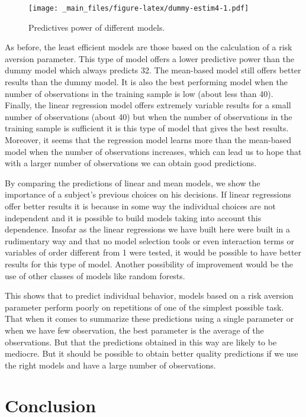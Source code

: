 \documentclass[
]{book}
\begin{document}
\begin{figure}
\centering
\texttt{[image: \_main\_files/figure-latex/dummy-estim4-1.pdf]}
\caption{\label{fig:dummy-estim4}Predictives power of different models.}
\end{figure}

As before, the least efficient models are those based on the calculation
of a risk aversion parameter. This type of model offers a lower
predictive power than the dummy model which always predicts 32. The
mean-based model still offers better results than the dummy model. It is
also the best performing model when the number of observations in the
training sample is low (about less than 40). Finally, the linear
regression model offers extremely variable results for a small number of
observations (about 40) but when the number of observations in the
training sample is sufficient it is this type of model that gives the
best results. Moreover, it seems that the regression model learns more
than the mean-based model when the number of observations increases,
which can lead us to hope that with a larger number of observations we
can obtain good predictions.

By comparing the predictions of linear and mean models, we show the
importance of a subject's previous choices on his decisions. If linear
regressions offer better results it is because in some way the
individual choices are not independent and it is possible to build
models taking into account this dependence. Insofar as the linear
regressions we have built here were built in a rudimentary way and that
no model selection tools or even interaction terms or variables of order
different from 1 were tested, it would be possible to have better
results for this type of model. Another possibility of improvement would
be the use of other classes of models like random forests.

This shows that to predict individual behavior, models based on a risk
aversion parameter perform poorly on repetitions of one of the simplest possible
task.
That when it comes to summarize these predictions using a single parameter or
when we have few observation, the best parameter is the
average of the observations. But that the predictions obtained in this way
are likely to be mediocre. But it should be possible to obtain better
quality predictions if we use the right models and have a large number
of observations.

\hypertarget{discu4}{%
\section{Conclusion}\label{discu4}}
\end{document}
